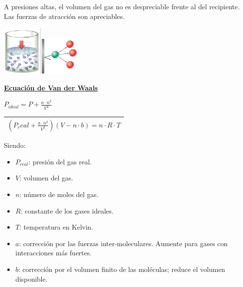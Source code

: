             \sangria{} A presiones altas, el volumen del gas no es despreciable frente al del recipiente. Las fuerzas de atracción son apreciables.
            \begin{center} \includegraphics[width=2cm]{./imagenes/presionesAltasGasIdeal1.png}\hspace{1cm}\includegraphics[width=2cm]{./imagenes/presionesAltasGasIdeal2.png} \end{center}
            \begin{center} \textbf{\underline{Ecuación de Van der Waals}} \end{center}
            \begin{center} $P_{ideal} = P + \frac{a \cdot n^2}{V^2}$ \end{center}
            \begin{center} \begin{tabular}{| c |} \hline $(P_real + \frac{a \cdot n^2}{V^2}) (V -n \cdot b) = n \cdot R \cdot T$ \\ \hline \end{tabular} \end{center}
            \columnbreak{}
            \sangria{} Siendo:
            \begin{itemize}
                \item $P_{real}$: presión del gas real.
                \item $V$: volumen del gas.
                \item $n$: número de moles del gas.
                \item $R$: constante de los gases ideales.
                \item $T$: temperatura en Kelvin.
                \item $a$: corrección por las fuerzas inter-moleculares. Aumente para gases con interacciones más fuertes.
                \item $b$: corrección por el volumen finito de las moléculas; reduce el volumen disponible.
            \end{itemize}
